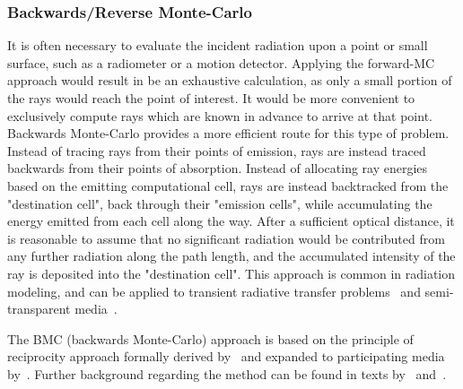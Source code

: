 \subsubsection{Backwards/Reverse Monte-Carlo}
It is often necessary to evaluate the incident radiation upon a point or small surface, such as a radiometer or a motion detector.
Applying the forward-MC approach would result in be an exhaustive calculation, as only a small portion of the rays would reach the point of interest. It would be more convenient to exclusively compute rays which are known in advance to arrive at that point. 
Backwards Monte-Carlo provides a more efficient route for this type of problem.
Instead of tracing rays from their points of emission, rays are instead traced backwards from their points of absorption.
Instead of allocating ray energies based on the emitting computational cell, rays are instead backtracked from the "destination cell", back through their "emission cells", while accumulating the energy emitted from each cell along the way. After a sufficient optical distance, it is reasonable to assume that no significant radiation would be contributed from any further radiation along the path length, and the accumulated intensity of the ray is deposited into the "destination cell". 
This approach is common in radiation modeling, and can be applied to transient radiative transfer problems~\cite{Lu2004ReverseMedia} and semi-transparent media~\cite{Li2005BackwardSlab}.

The BMC (backwards Monte-Carlo) approach is based on the principle of reciprocity approach formally derived by~\citet{Case1957TransferPrinciple} and expanded to participating media by~\citet{Walters1992RigorousMedia}.
Further background regarding the method can be found in texts by~\citet{Modest2003BackwardTransfer} and~\citet{Howell2010ThermalTransfer}.

